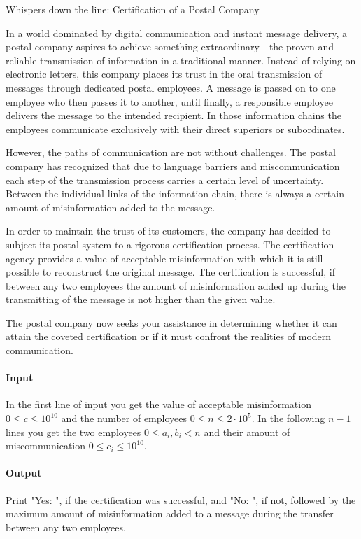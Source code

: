 



\makeheader

Whispers down the line: Certification of a Postal Company

In a world dominated by digital communication and instant message delivery, a postal company aspires to achieve something extraordinary - the proven and reliable transmission of information in a traditional manner. 
Instead of relying on electronic letters, this company places its trust in the oral transmission of messages through dedicated postal employees. 
A message is passed on to one employee who then passes it to another, until finally, a responsible employee delivers the message to the intended recipient. 
In those information chains the employees communicate exclusively with their direct superiors or subordinates.

However, the paths of communication are not without challenges. 
The postal company has recognized that due to language barriers and miscommunication each step of the transmission process carries a certain level of uncertainty. 
Between the individual links of the information chain, there is always a certain amount of misinformation added to the message.

In order to maintain the trust of its customers, the company has decided to subject its postal system to a rigorous certification process.
The certification agency provides a value of acceptable misinformation with which it is still possible to reconstruct the original message.
The certification is successful, if between any two employees the amount of misinformation added up during the transmitting of the message is not higher than the given value.

The postal company now seeks your assistance in determining whether it can attain the coveted certification or if it must confront the realities of modern communication.


\paragraph*{Input}

In the first line of input you get the value of acceptable misinformation $0 \leq c \leq 10^{10}$ and the number of employees $0 \leq n \leq 2\cdot 10^5.$
In the following $n-1$ lines you get the two employees $0 \leq a_i, b_i < n$ and their amount of miscommunication $0 \leq c_i \leq 10^{10}.$

\paragraph*{Output}

Print "Yes: ", if the certification was successful, and "No: ", if not, followed by the maximum amount of misinformation added to a message during the transfer between any two employees.

\begin{samples}
\end{samples}


